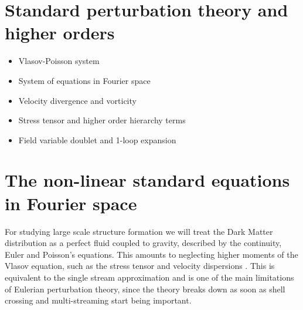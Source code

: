 %
%
%


\section{Standard perturbation theory and higher orders}
\begin{itemize}
\item Vlasov-Poisson system
\item System of equations in Fourier space
\item Velocity divergence and vorticity
\item Stress tensor and higher order hierarchy terms
\item Field variable doublet and 1-loop expansion
\end{itemize}



\section{The non-linear standard equations in Fourier space}

For studying large scale structure formation we will treat the Dark
Matter distribution as a perfect fluid coupled to gravity, described
by the continuity, Euler and Poisson's equations. This amounts to
neglecting higher moments of the Vlasov equation, such as the stress
tensor and velocity dispersions \cite{bernardeau_large-scale_2001}.
This is equivalent to the single stream approximation and is one of
the main limitations of Eulerian perturbation theory, since the theory
breaks down as soon as shell crossing and multi-streaming start being
important.

